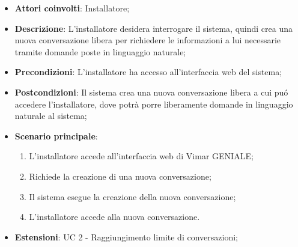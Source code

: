 \begin{itemize}
    \item \textbf{Attori coinvolti}: Installatore;
    \item \textbf{Descrizione}: L’installatore desidera interrogare il sistema, quindi crea una nuova conversazione libera per richiedere le informazioni a lui necessarie tramite domande poste in linguaggio naturale;
    \item \textbf{Precondizioni}: L’installatore ha accesso all’interfaccia web del sistema;
    \item \textbf{Postcondizioni}: Il sistema crea una nuova conversazione libera a cui puó accedere l’installatore, dove potrà porre liberamente domande in linguaggio naturale al sistema;
    \item \textbf{Scenario principale}:
    \begin{enumerate}
    \item L’installatore accede all’interfaccia web di Vimar GENIALE;
    \item Richiede la creazione di una nuova conversazione;
    \item Il sistema esegue la creazione della nuova conversazione;
    \item L’installatore accede alla nuova conversazione.
    \end{enumerate}
    \item \textbf{Estensioni}: UC 2 - Raggiungimento limite di conversazioni;
\end{itemize}

